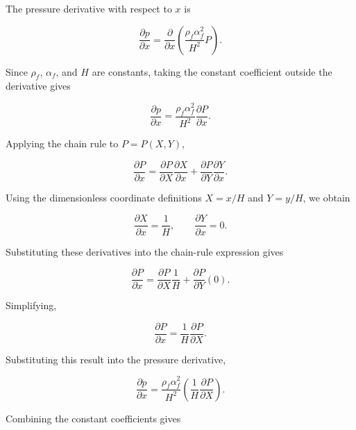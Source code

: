 \documentclass[preprint,3p,number]{elsarticle}
\begin{document}
The pressure derivative with respect to \(x\) is

\begin{equation}
\frac{\partial p}{\partial x}
=
\frac{\partial}{\partial x}
\left(
\frac{\rho_f\alpha_f^2}{H^2}P
\right).
\end{equation}

Since \(\rho_f\), \(\alpha_f\), and \(H\) are constants, taking the
constant coefficient outside the derivative gives

\begin{equation}
\frac{\partial p}{\partial x}
=
\frac{\rho_f\alpha_f^2}{H^2}
\frac{\partial P}{\partial x}.
\end{equation}

Applying the chain rule to \(P=P(X,Y)\),

\begin{equation}
\frac{\partial P}{\partial x}
=
\frac{\partial P}{\partial X}
\frac{\partial X}{\partial x}
+
\frac{\partial P}{\partial Y}
\frac{\partial Y}{\partial x}.
\end{equation}

Using the dimensionless coordinate definitions
\(X=x/H\) and \(Y=y/H\), we obtain

\begin{equation}
\frac{\partial X}{\partial x}=\frac{1}{H},
\qquad
\frac{\partial Y}{\partial x}=0.
\end{equation}

Substituting these derivatives into the chain-rule expression gives

\begin{equation}
\frac{\partial P}{\partial x}
=
\frac{\partial P}{\partial X}\frac{1}{H}
+
\frac{\partial P}{\partial Y}(0).
\end{equation}

Simplifying,

\begin{equation}
\frac{\partial P}{\partial x}
=
\frac{1}{H}\frac{\partial P}{\partial X}.
\end{equation}

Substituting this result into the pressure derivative,

\begin{equation}
\frac{\partial p}{\partial x}
=
\frac{\rho_f\alpha_f^2}{H^2}
\left(
\frac{1}{H}\frac{\partial P}{\partial X}
\right).
\end{equation}

Combining the constant coefficients gives
\end{document}
